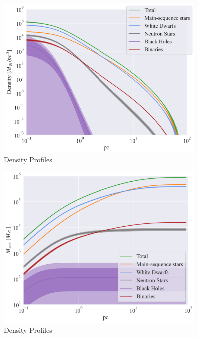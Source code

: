 \begin{figure}
	\begin{center}
\includegraphics[width=0.9\textwidth]{figures/low_bin_model/density.png}
	\end{center}
\caption{Density Profiles}
	\label{fig:low_bin_model_densities}
\end{figure}

\begin{figure}
	\begin{center}
		\includegraphics[width=0.9\textwidth]{figures/low_bin_model/mass_enc.png}
	\end{center}
	\caption{Density Profiles}
	\label{fig:low_bin_model_enclosed_mass}
\end{figure}

